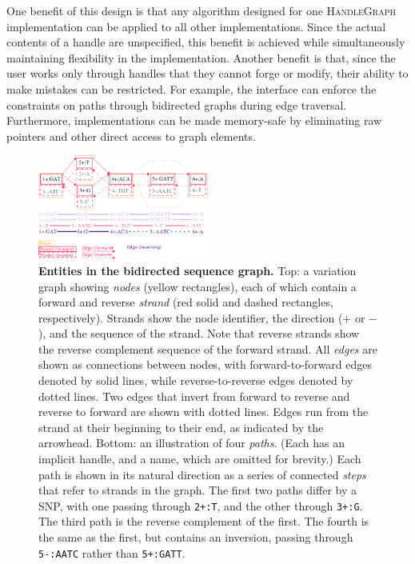 \documentclass{bioinfo}
\begin{document}
\begin{methods}
One benefit of this design is that any algorithm designed for one \textsc{HandleGraph} implementation can be applied to all other implementations.
Since the actual contents of a handle are unspecified, this benefit is achieved while simultaneously maintaining flexibility in the implementation.
Another benefit is that, since the user works only through handles that they cannot forge or modify, their ability to make mistakes can be restricted.
For example, the interface can enforce the constraints on paths through bidirected graphs during edge traversal.
Furthermore, implementations can be made memory-safe by eliminating raw pointers and other direct access to graph elements.


\begin{figure}
	\begin{center}
		\includegraphics[width=0.5\textwidth]{figures/GRaphchrXpaper.png}
	\end{center}
	\caption{{\label{fig:graph}
        \textbf{Entities in the bidirected sequence graph.}
        Top: a variation graph showing \emph{nodes} (yellow rectangles), each of which contain a forward and reverse \emph{strand} (red solid and dashed rectangles, respectively).
        Strands show the node identifier, the direction ($+$ or $-$), and the sequence of the strand.
        Note that reverse strands show the reverse complement sequence of the forward strand.
        All \emph{edges} are shown as connections between nodes, with forward-to-forward edges denoted by solid lines, while reverse-to-reverse edges denoted by dotted lines.
        Two edges that invert from forward to reverse and reverse to forward are shown with dotted lines.
        Edges run from the strand at their beginning to their end, as indicated by the arrowhead.
        Bottom: an illustration of four \emph{paths}.
        (Each has an implicit handle, and a name, which are omitted for brevity.)
        Each path is shown in its natural direction as a series of connected \emph{steps} that refer to strands in the graph.
        The first two paths differ by a SNP, with one passing through \texttt{2+:T}, and the other through \texttt{3+:G}.
        The third path is the reverse complement of the first.
        The fourth is the same as the first, but contains an inversion, passing through \texttt{5-:AATC} rather than \texttt{5+:GATT}.
      }
    }
\end{figure}


\end{methods}
\end{document}
